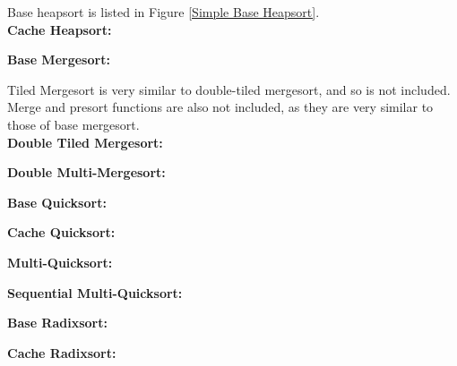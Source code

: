Base heapsort is listed in Figure \ref{Simple Base Heapsort}.\\
\textbf{Cache Heapsort:}

\textbf{Base Mergesort:}

Tiled Mergesort is very similar to double-tiled mergesort, and so is not
included. Merge and presort functions are also not included, as they are very
similar to those of base mergesort.\\
\textbf{Double Tiled Mergesort:}

\textbf{Double Multi-Mergesort:}

\textbf{Base Quicksort:}

\textbf{Cache Quicksort:}

\textbf{Multi-Quicksort:}

\textbf{Sequential Multi-Quicksort:}

\textbf{Base Radixsort:}

\textbf{Cache Radixsort:}
